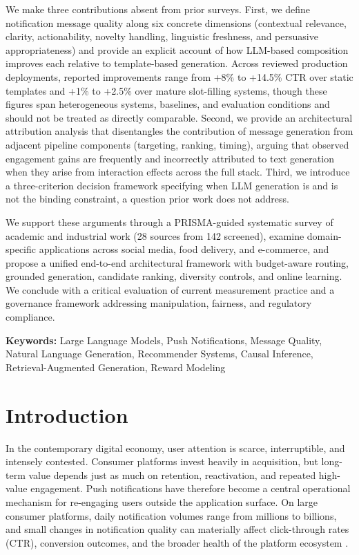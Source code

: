\documentclass[11pt]{article}
\begin{document}
We make three contributions absent from prior surveys. First, we define notification message quality along six concrete dimensions (contextual relevance, clarity, actionability, novelty handling, linguistic freshness, and persuasive appropriateness) and provide an explicit account of how LLM-based composition improves each relative to template-based generation. Across reviewed production deployments, reported improvements range from +8\% to +14.5\% CTR over static templates and +1\% to +2.5\% over mature slot-filling systems, though these figures span heterogeneous systems, baselines, and evaluation conditions and should not be treated as directly comparable. Second, we provide an architectural attribution analysis that disentangles the contribution of message generation from adjacent pipeline components (targeting, ranking, timing), arguing that observed engagement gains are frequently and incorrectly attributed to text generation when they arise from interaction effects across the full stack. Third, we introduce a three-criterion decision framework specifying when LLM generation is and is not the binding constraint, a question prior work does not address.

We support these arguments through a PRISMA-guided systematic survey of academic and industrial work (28 sources from 142 screened), examine domain-specific applications across social media, food delivery, and e-commerce, and propose a unified end-to-end architectural framework with budget-aware routing, grounded generation, candidate ranking, diversity controls, and online learning. We conclude with a critical evaluation of current measurement practice and a governance framework addressing manipulation, fairness, and regulatory compliance.

\vspace{0.5em}
\noindent\textbf{Keywords:} Large Language Models, Push Notifications, Message Quality, Natural Language Generation, Recommender Systems, Causal Inference, Retrieval-Augmented Generation, Reward Modeling

\section{Introduction}

In the contemporary digital economy, user attention is scarce, interruptible, and intensely contested. Consumer platforms invest heavily in acquisition, but long-term value depends just as much on retention, reactivation, and repeated high-value engagement. Push notifications have therefore become a central operational mechanism for re-engaging users outside the application surface. On large consumer platforms, daily notification volumes range from millions to billions, and small changes in notification quality can materially affect click-through rates (CTR), conversion outcomes, and the broader health of the platform ecosystem \citep{bie2026pushgen}.
\end{document}
